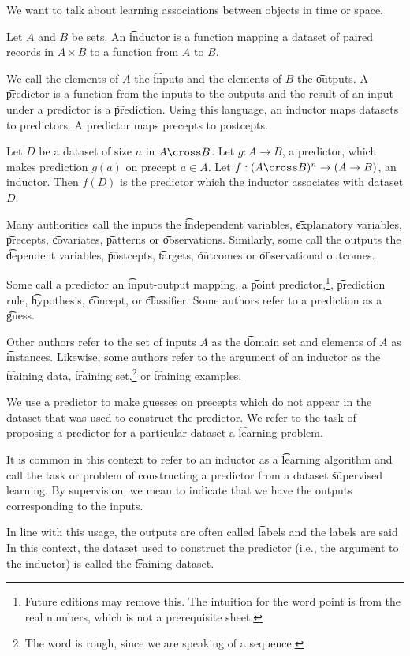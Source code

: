 

We want to talk about learning associations between objects in time or space.


Let $A$ and $B$ be sets.
An \t{inductor} is a function mapping a dataset of paired records in $A \times B$ to a function from $A$ to $B$.

We call the elements of $A$ the \t{inputs} and the elements of $B$ the \t{outputs}.
A \t{predictor} is a function from the inputs to the outputs and the result of an input under a predictor is a \t{prediction}.
Using this language, an inductor maps datasets to predictors.
A predictor maps precepts to postcepts.


Let $D$ be a dataset of size $n$ in $A \cross B$.
Let $g: A \to B$, a predictor, which makes prediction $g(a)$ on precept $a \in A$.
Let $f: (A \cross B)^n \to (A \to B)$, an inductor.
Then $f(D)$ is the predictor which the inductor associates with dataset $D$.


Many authorities call the inputs the \t{independent variables}, \t{explanatory variables}, \t{precepts}, \t{covariates}, \t{patterns} or \t{observations}.
Similarly, some call the outputs the \t{dependent variables}, \t{postcepts}, \t{targets}, \t{outcomes} or \t{observational outcomes}.

Some call a predictor an \t{input-output} mapping, a \t{point predictor},\footnote{Future editions may remove this. The intuition for the word point is from the real numbers, which is not a prerequisite sheet.}, \t{prediction rule}, \t{hypothesis}, \t{concept}, or \t{classifier}.
Some authors refer to a prediction as a \t{guess}.

Other authors refer to the set of inputs $A$ as the \t{domain set} and elements of $A$ as \t{instances}.
Likewise, some authors refer to the argument of an inductor as the \t{training data}, \t{training set},\footnote{The word  is rough, since we are speaking of a sequence.} or \t{training examples}.


We use a predictor to make guesses on precepts which do not appear in the dataset that was used to construct the predictor.
We refer to the task of proposing a predictor for a particular dataset a \t{learning problem}.

It is common in this context to refer to an inductor as a \t{learning algorithm} and call the task or problem of constructing a predictor from a dataset  \t{supervised learning}.
By supervision, we mean to indicate that we have the outputs corresponding to the inputs.

In line with this usage, the outputs are often called \t{labels} and the labels are said 
In this context, the dataset used to construct the predictor (i.e., the argument to the inductor) is called the \t{training dataset}.
